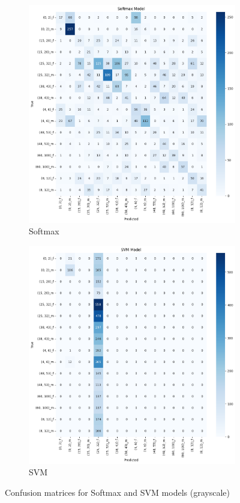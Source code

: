 \documentclass{article}
\begin{document}
\begin{figure}[H]
    \centering
    \begin{subfigure}[b]{0.48\textwidth}
        \includegraphics[width=\textwidth]{assets/confusion_matrix/grayscale/Softmax Model.png}
        \caption{Softmax}
    \end{subfigure}
    \hfill
    \begin{subfigure}[b]{0.48\textwidth}
        \includegraphics[width=\textwidth]{assets/confusion_matrix/grayscale/SVM Model.png}
        \caption{SVM}
    \end{subfigure}
    \caption{Confusion matrices for Softmax and SVM models (grayscale)}
    \label{fig:grayscale_confusion_matrices_1}
\end{figure}
\end{document}
